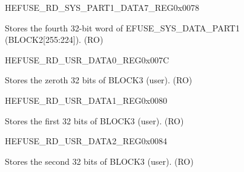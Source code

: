 \begin{register}{H}{EFUSE\_RD\_SYS\_PART1\_DATA7\_REG}{0x0078}\label{regdesc:EFUSERDSYSPART1DATA7REG}
%
\regnewline%
\begin{regdesc}\begin{reglist}
\label{fielddesc:EFUSESYSDATAPART17}\item [EFUSE\_SYS\_DATA\_PART1\_7] Stores the fourth 32-bit word of EFUSE\_SYS\_DATA\_PART1 (BLOCK2[255:224]). (RO)
\end{reglist}\end{regdesc}
\end{register}


\begin{register}{H}{EFUSE\_RD\_USR\_DATA0\_REG}{0x007C}\label{regdesc:EFUSERDUSRDATA0REG}
%
\regnewline%
\begin{regdesc}\begin{reglist}
\label{fielddesc:EFUSEUSRDATA0}\item [EFUSE\_USR\_DATA0] Stores the zeroth 32 bits of BLOCK3 (user). (RO)
\end{reglist}\end{regdesc}
\end{register}


\begin{register}{H}{EFUSE\_RD\_USR\_DATA1\_REG}{0x0080}\label{regdesc:EFUSERDUSRDATA1REG}
%
\regnewline%
\begin{regdesc}\begin{reglist}
\label{fielddesc:EFUSEUSRDATA1}\item [EFUSE\_USR\_DATA1] Stores the first 32 bits of BLOCK3 (user). (RO)
\end{reglist}\end{regdesc}
\end{register}


\begin{register}{H}{EFUSE\_RD\_USR\_DATA2\_REG}{0x0084}\label{regdesc:EFUSERDUSRDATA2REG}
%
\regnewline%
\begin{regdesc}\begin{reglist}
\label{fielddesc:EFUSEUSRDATA2}\item [EFUSE\_USR\_DATA2] Stores the second 32 bits of BLOCK3 (user). (RO)
\end{reglist}\end{regdesc}
\end{register}


